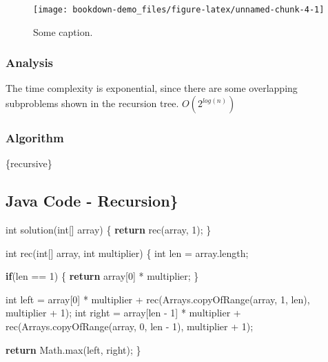 \documentclass[]{book}
\newenvironment{Shaded}{\begin{snugshade}}{\end{snugshade}}
\newcommand{\BuiltInTok}[1]{#1}
\newcommand{\DataTypeTok}[1]{\textcolor[rgb]{0.13,0.29,0.53}{#1}}
\newcommand{\DecValTok}[1]{\textcolor[rgb]{0.00,0.00,0.81}{#1}}
\newcommand{\FunctionTok}[1]{\textcolor[rgb]{0.00,0.00,0.00}{#1}}
\newcommand{\KeywordTok}[1]{\textcolor[rgb]{0.13,0.29,0.53}{\textbf{#1}}}
\newcommand{\NormalTok}[1]{#1}
\begin{document}
\begin{figure}
\texttt{[image: bookdown-demo\_files/figure-latex/unnamed-chunk-4-1]} \caption{Some caption.}\label{fig:unnamed-chunk-4}
\end{figure}

\hypertarget{analysis-39}{%
\subsubsection{Analysis}\label{analysis-39}}

The time complexity is exponential, since there are some overlapping subproblems shown in the recursion tree.
\(O(2^{log(n)})\)

\hypertarget{algorithm-39}{%
\subsubsection{Algorithm}\label{algorithm-39}}

\{recursive\}

\hypertarget{java-code---recursion}{%
\subsection{Java Code - Recursion\}}\label{java-code---recursion}}

\begin{Shaded}
\begin{Highlighting}[]
\DataTypeTok{int} \FunctionTok{solution}\NormalTok{(}\DataTypeTok{int}\NormalTok{[] array) \{}
    \KeywordTok{return} \FunctionTok{rec}\NormalTok{(array, }\DecValTok{1}\NormalTok{);}
\NormalTok{\}}

\DataTypeTok{int} \FunctionTok{rec}\NormalTok{(}\DataTypeTok{int}\NormalTok{[] array, }\DataTypeTok{int}\NormalTok{ multiplier) \{}
    \DataTypeTok{int}\NormalTok{ len = array.}\FunctionTok{length}\NormalTok{;}

    \KeywordTok{if}\NormalTok{(len == }\DecValTok{1}\NormalTok{) \{}
        \KeywordTok{return}\NormalTok{ array[}\DecValTok{0}\NormalTok{] * multiplier;}
\NormalTok{    \}}

    \DataTypeTok{int}\NormalTok{ left = array[}\DecValTok{0}\NormalTok{] * multiplier + }\FunctionTok{rec}\NormalTok{(}\BuiltInTok{Arrays}\NormalTok{.}\FunctionTok{copyOfRange}\NormalTok{(array, }\DecValTok{1}\NormalTok{, len), multiplier + }\DecValTok{1}\NormalTok{);}
    \DataTypeTok{int}\NormalTok{ right = array[len - }\DecValTok{1}\NormalTok{] * multiplier + }\FunctionTok{rec}\NormalTok{(}\BuiltInTok{Arrays}\NormalTok{.}\FunctionTok{copyOfRange}\NormalTok{(array, }\DecValTok{0}\NormalTok{, len - }\DecValTok{1}\NormalTok{), multiplier + }\DecValTok{1}\NormalTok{);}

    \KeywordTok{return} \BuiltInTok{Math}\NormalTok{.}\FunctionTok{max}\NormalTok{(left, right);}
\NormalTok{\}}
\end{Highlighting}
\end{Shaded}
\end{document}
